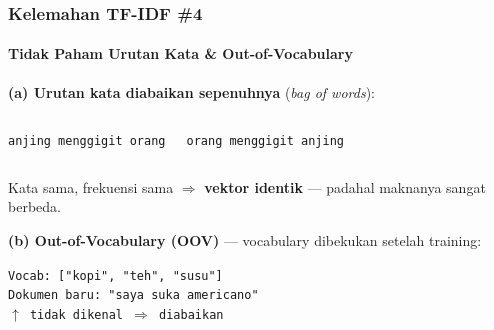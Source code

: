 \documentclass[t,aspectratio=169,xcolor=dvipsnames]{beamer}
\begin{document}
\begin{frame}
    \frametitle{Kelemahan TF-IDF \#4}
    \framesubtitle{Tidak Paham Urutan Kata \& Out-of-Vocabulary}
    \small
    \textbf{(a) Urutan kata diabaikan sepenuhnya} (\textit{bag of words}):
    \vspace{0.2em}
    \begin{columns}[T]
        \begin{tcolorbox}[colback=gray!10, colframe=gray!40]
            \texttt{anjing menggigit orang}
        \end{tcolorbox}
        \begin{tcolorbox}[colback=gray!10, colframe=gray!40]
            \texttt{orang menggigit anjing}
        \end{tcolorbox}
    \end{columns}
    \vspace{0.2em}
    Kata sama, frekuensi sama $\Rightarrow$ \textbf{vektor identik} --- padahal maknanya sangat berbeda.
    \vspace{0.5em}

    \textbf{(b) Out-of-Vocabulary (OOV)} --- vocabulary dibekukan setelah training:
    \vspace{0.2em}
    \begin{tcolorbox}[colback=gray!10, colframe=gray!40]
        \texttt{\small Vocab: ["kopi", "teh", "susu"]}\\[0.15em]
        \texttt{\small Dokumen baru: "saya suka americano"}\\
        \texttt{\small \hspace{12.3em}$\uparrow$ tidak dikenal $\Rightarrow$ diabaikan}
    \end{tcolorbox}
\end{frame}
\end{document}
